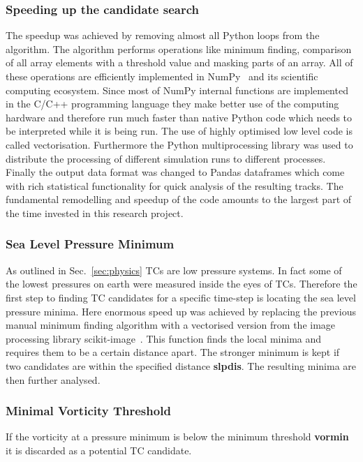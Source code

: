 \subsubsection*{Speeding up the candidate search}
The speedup was achieved by removing almost all Python loops from the algorithm. The algorithm performs operations like minimum finding, comparison of all array elements with a threshold value and masking parts of an array. All of these operations are efficiently implemented in NumPy~\cite{numpy} and its scientific computing ecosystem. Since most of NumPy internal functions are implemented in the C/C++ programming language they make better use of the computing hardware and therefore run much faster than native Python code which needs to be interpreted while it is being run. The use of highly optimised low level code is called vectorisation.
Furthermore the Python multiprocessing library was used to distribute the processing of different simulation runs to different processes.\newline
Finally the output data format was changed to Pandas dataframes which come with rich statistical functionality for quick analysis of the resulting tracks.\newline
The fundamental remodelling and speedup of the code amounts to the largest part of the time invested in this research project.

\subsubsection*{Sea Level Pressure Minimum}
As outlined in Sec.~\ref{sec:physics} TCs are low pressure systems. In fact
some of the lowest pressures on earth were measured inside the eyes of TCs.
Therefore the first step to finding TC candidates for a specific time-step is
locating the sea level pressure minima. Here enormous speed up was achieved by
replacing the previous manual minimum finding algorithm with a vectorised
version from the image processing library scikit-image~\cite{scikit-image}.
This function finds the local minima and requires them to be a certain distance
apart. The stronger minimum is kept if two candidates are within the specified
distance \textbf{slpdis}. The resulting minima are then further
analysed.
\subsubsection*{Minimal Vorticity Threshold}
If the vorticity at a pressure minimum is below the minimum threshold
\textbf{vormin} it is discarded as a potential TC candidate.

